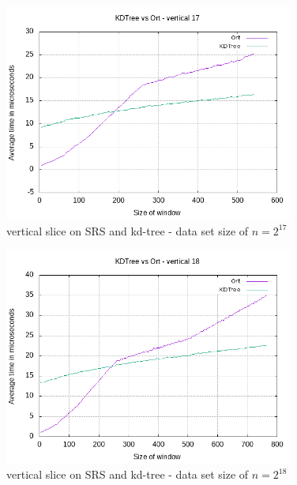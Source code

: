 \begin{figure}[h]
    \centering
    \includegraphics[width = 0.85\textwidth]{pictures/analysis/vert_17.png}
    \caption{vertical slice on SRS and kd-tree - data set size of $n=2^{17}$}\label{fig:vert_17}
\end{figure}

\begin{figure}[h]
    \centering
    \includegraphics[width = 0.85\textwidth]{pictures/analysis/vert_18.png}
    \caption{vertical slice on SRS and kd-tree - data set size of $n=2^{18}$}\label{fig:vert_18}
\end{figure}

